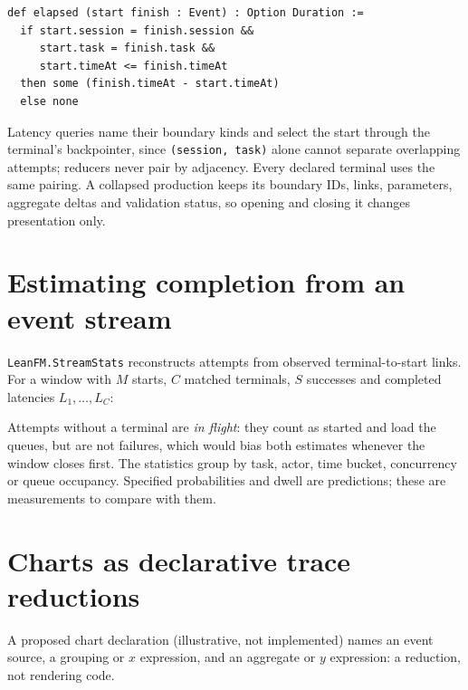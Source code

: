 \begin{lstlisting}
def elapsed (start finish : Event) : Option Duration :=
  if start.session = finish.session &&
     start.task = finish.task &&
     start.timeAt <= finish.timeAt
  then some (finish.timeAt - start.timeAt)
  else none
\end{lstlisting}

Latency queries name their boundary kinds and select the start through the
terminal's backpointer, since \texttt{(session, task)} alone cannot separate
overlapping attempts; reducers never pair by adjacency. Every declared terminal
uses the same pairing. A collapsed production keeps its boundary IDs, links,
parameters, aggregate deltas and validation status, so opening and closing it
changes presentation only.

\section{Estimating completion from an event stream}

\texttt{LeanFM.StreamStats} reconstructs attempts from observed terminal-to-start
links. For a window with $M$ starts, $C$ matched terminals, $S$ successes and
completed latencies $L_1,\ldots,L_C$:

Attempts without a terminal are \emph{in flight}: they count as started and load
the queues, but are not failures, which would bias both estimates whenever the
window closes first. The statistics group by task, actor, time bucket, concurrency
or queue occupancy. Specified probabilities and dwell are predictions; these are
measurements to compare with them.

\section{Charts as declarative trace reductions}

A proposed chart declaration (illustrative, not implemented) names an event
source, a grouping or \(x\) expression, and an aggregate or \(y\) expression: a
reduction, not rendering code.

